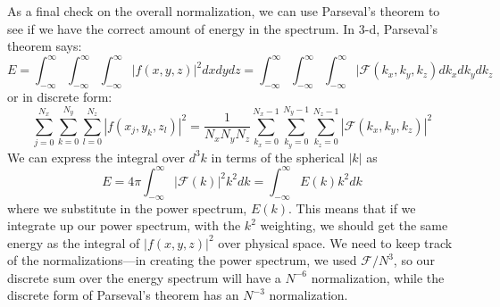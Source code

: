 \documentclass[11pt]{article}
\begin{document}
As a final check on the overall normalization, we can use Parseval's theorem
to see if we have the correct amount of energy in the spectrum.  In 3-d,
Parseval's theorem says:
\begin{equation}
E = \int_{-\infty}^{\infty} \int_{-\infty}^{\infty} \int_{-\infty}^{\infty} |f(x,y,z)|^2 dx dy dz = 
  \int_{-\infty}^{\infty} \int_{-\infty}^{\infty} \int_{-\infty}^{\infty}  |\mathcal{F}(k_x,k_y,k_z) dk_x dk_y dk_z
\end{equation}
or in discrete form:
\begin{equation}
\sum_{j=0}^{N_x} \sum_{k=0}^{N_y} \sum_{l=0}^{N_z}
   | f(x_j, y_k, z_l) |^2 = \frac{1}{N_x N_y N_z} 
 \sum_{k_x=0}^{N_x-1} \sum_{k_y=0}^{N_y-1} \sum_{k_z=0}^{N_z-1} 
   | \mathcal{F}(k_x, k_y, k_z) |^2
\end{equation}
We can express the integral over $d^3k$ in terms of the spherical $|k|$ as
\begin{equation}
E = 4\pi \int_{-\infty}^{\infty} |\mathcal{F}(k)|^2 k^2 dk = \int_{-\infty}^{\infty} E(k) k^2 dk
\end{equation}
where we substitute in the power spectrum, $E(k)$.  This means that if we integrate up our
power spectrum, with the $k^2$ weighting, we should get the same energy as the integral
of $|f(x,y,z)|^2$ over physical space.  We need to keep track of the normalizations---in
creating the power spectrum, we used $\mathcal{F}/N^3$, so our discrete sum over the energy
spectrum will have a $N^{-6}$ normalization, while the discrete form of Parseval's theorem
has an $N^{-3}$ normalization.
\end{document}
